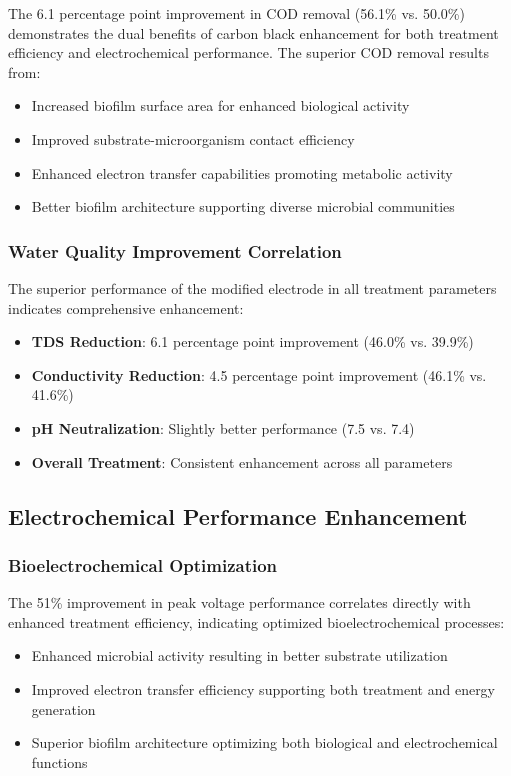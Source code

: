\documentclass[12pt,a4paper]{article}
\begin{document}
The 6.1 percentage point improvement in COD removal (56.1\% vs. 50.0\%) demonstrates the dual benefits of carbon black enhancement for both treatment efficiency and electrochemical performance. The superior COD removal results from:
\begin{itemize}
    \item Increased biofilm surface area for enhanced biological activity
    \item Improved substrate-microorganism contact efficiency
    \item Enhanced electron transfer capabilities promoting metabolic activity
    \item Better biofilm architecture supporting diverse microbial communities
\end{itemize}

\subsubsection{Water Quality Improvement Correlation}

The superior performance of the modified electrode in all treatment parameters indicates comprehensive enhancement:
\begin{itemize}
    \item \textbf{TDS Reduction}: 6.1 percentage point improvement (46.0\% vs. 39.9\%)
    \item \textbf{Conductivity Reduction}: 4.5 percentage point improvement (46.1\% vs. 41.6\%)
    \item \textbf{pH Neutralization}: Slightly better performance (7.5 vs. 7.4)
    \item \textbf{Overall Treatment}: Consistent enhancement across all parameters
\end{itemize}

\subsection{Electrochemical Performance Enhancement}

\subsubsection{Bioelectrochemical Optimization}

The 51\% improvement in peak voltage performance correlates directly with enhanced treatment efficiency, indicating optimized bioelectrochemical processes:
\begin{itemize}
    \item Enhanced microbial activity resulting in better substrate utilization
    \item Improved electron transfer efficiency supporting both treatment and energy generation
    \item Superior biofilm architecture optimizing both biological and electrochemical functions
\end{itemize}
\end{document}
